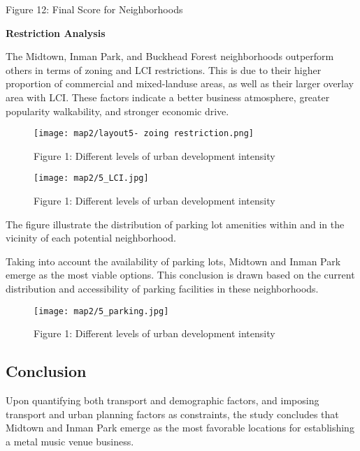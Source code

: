 \documentclass[11pt]{article}
\begin{document}
\begin{center}
\centering
Figure 12: Final Score for Neighborhoods
\end{center}

\newpage
\textbf{Restriction Analysis}

The Midtown, Inman Park, and Buckhead Forest neighborhoods outperform others in terms of zoning and LCI restrictions. This is due to their higher proportion of commercial and mixed-landuse areas, as well as their larger overlay area with LCI. These factors indicate a better business atmosphere, greater popularity walkability, and stronger economic drive.

\begin{figure}[H]
\begin{center}
\centering
\texttt{[image: map2/layout5- zoing restriction.png]}
\caption{Figure 1: Different levels of urban development intensity}
\label{fig:figure1}
\end{center}
\end{figure}

\begin{figure}[H]
\begin{center}
\centering
\texttt{[image: map2/5\_LCI.jpg]}
\caption{Figure 1: Different levels of urban development intensity}
\label{fig:figure1}
\end{center}
\end{figure}

The figure illustrate the distribution of parking lot amenities within and in the vicinity of each potential neighborhood. 

Taking into account the availability of parking lots, Midtown and Inman Park emerge as the most viable options. This conclusion is drawn based on the current distribution and accessibility of parking facilities in these neighborhoods.

\begin{figure}[H]
\begin{center}
\centering
\texttt{[image: map2/5\_parking.jpg]}
\caption{Figure 1: Different levels of urban development intensity}
\label{fig:figure1}
\end{center}
\end{figure}

\subsection{Conclusion}
Upon quantifying both transport and demographic factors, and imposing transport and urban planning factors as constraints, the study concludes that Midtown and Inman Park emerge as the most favorable locations for establishing a metal music venue business.
\end{document}
